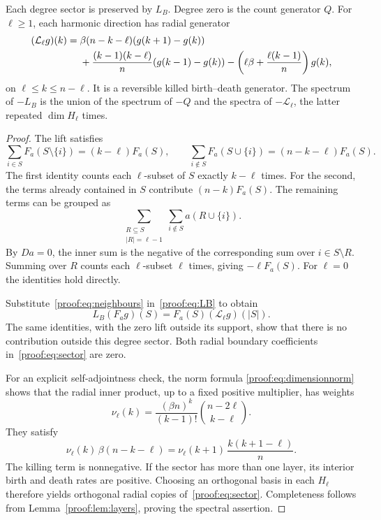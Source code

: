 \begin{lemma}\label{proof:lem:sectoraction}
Each degree sector is preserved by $L_B$. Degree zero is the count
generator $Q$. For $\ell\geq1$, each harmonic direction has radial
generator
\begin{align}
 (\mathcal L_\ell g)(k)
 ={}&\beta(n-k-\ell)(g(k+1)-g(k))\notag\\
 &+\frac{(k-1)(k-\ell)}n(g(k-1)-g(k))
  -\left(\ell\beta+\frac{\ell(k-1)}n\right)g(k),
 \label{proof:eq:sector}
\end{align}
on $\ell\leq k\leq n-\ell$. It is a reversible killed birth--death
generator. The spectrum of $-L_B$ is the union of the spectrum of
$-Q$ and the spectra of $-\mathcal L_\ell$, the latter repeated
$\dim H_\ell$ times.
\end{lemma}

\begin{proof}
The lift satisfies
\begin{equation}\label{proof:eq:neighbours}
 \sum_{i\in S}F_a(S\setminus\{i\})=(k-\ell)F_a(S),
 \qquad
 \sum_{i\notin S}F_a(S\cup\{i\})=(n-k-\ell)F_a(S).
\end{equation}
The first identity counts each $\ell$-subset of $S$ exactly $k-\ell$
times. For the second, the terms already contained in $S$ contribute
$(n-k)F_a(S)$. The remaining terms can be grouped as
\[
 \sum_{\substack{R\subseteq S\\|R|=\ell-1}}
 \sum_{i\notin S}a(R\cup\{i\}).
\]
By $Da=0$, the inner sum is the negative of the corresponding sum
over $i\in S\setminus R$. Summing over $R$ counts each
$\ell$-subset $\ell$ times, giving $-\ell F_a(S)$. For $\ell=0$
the identities hold directly.

Substitute~\eqref{proof:eq:neighbours} in~\eqref{proof:eq:LB} to obtain
\[
 L_B(F_ag)(S)=F_a(S)(\mathcal L_\ell g)(|S|).
\]
The same identities, with the zero lift outside its support, show
that there is no contribution outside this degree sector. Both
radial boundary coefficients in~\eqref{proof:eq:sector} are zero.

For an explicit self-adjointness check, the norm formula
\eqref{proof:eq:dimensionnorm} shows that the radial inner product,
up to a fixed positive multiplier, has weights
\begin{equation}\label{proof:eq:sectorweights}
 \nu_\ell(k)=\frac{(\beta n)^k}{(k-1)!}
               \binom{n-2\ell}{k-\ell}.
\end{equation}
They satisfy
\[
 \nu_\ell(k)\,\beta(n-k-\ell)
 =\nu_\ell(k+1)\,\frac{k(k+1-\ell)}n.
\]
The killing term is nonnegative. If the sector has more than one
layer, its interior birth and death rates are positive. Choosing an
orthogonal basis in each $H_\ell$ therefore yields orthogonal radial
copies of~\eqref{proof:eq:sector}. Completeness follows from
Lemma~\ref{proof:lem:layers}, proving the spectral assertion.
\end{proof}

